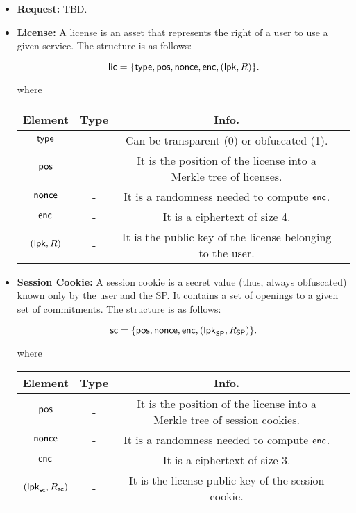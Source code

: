 \begin{itemize}
    \item \textbf{Request:} TBD.

    \item \textbf{License:} A license is an asset that represents the right of a user to use a given service. The structure is as follows:

    $$\mathsf{lic} = \{\mathsf{type}, \mathsf{pos}, \mathsf{nonce}, \mathsf{enc}, (\mathsf{lpk}, R)\}.$$

    where

    \begin{center}
        \begin{tabular}{ |c|c|c|c| } 
        \hline
        \textbf{Element} & \textbf{Type} & \textbf{Info.} \\
        \hline
        $\mathsf{type}$ & - & Can be transparent (0) or obfuscated (1). \\ 
        $\mathsf{pos}$ & - & It is the position of the license into a Merkle tree of licenses. \\ 
        $\mathsf{nonce}$ & - & It is a randomness needed to compute $\mathsf{enc}$. \\ 
        $\mathsf{enc}$ & - & It is a ciphertext of size 4. \\
        $(\mathsf{lpk}, R)$ & - & It is the public key of the license belonging to the user. \\
        \hline
        \end{tabular}
    \end{center}

    \item \textbf{Session Cookie:} A session cookie is a secret value (thus, always obfuscated) known only by the user and the SP. It contains a set of openings to a given set of commitments. The structure is as follows:

    $$\mathsf{sc} = \{\mathsf{pos}, \mathsf{nonce}, \mathsf{enc}, (\mathsf{lpk}_{\mathsf{SP}}, R_{\mathsf{SP}})\}.$$

    where

    \begin{center}
        \begin{tabular}{ |c|c|c|c| } 
        \hline
        \textbf{Element} & \textbf{Type} & \textbf{Info.} \\
        \hline
        $\mathsf{pos}$ & - & It is the position of the license into a Merkle tree of session cookies. \\ 
        $\mathsf{nonce}$ & - & It is a randomness needed to compute $\mathsf{enc}$. \\ 
        $\mathsf{enc}$ & - & It is a ciphertext of size 3. \\
        $(\mathsf{lpk}_{\mathsf{sc}}, R_{\mathsf{sc}})$ & - & It is the license public key of the session cookie. \\
        \hline
        \end{tabular}
    \end{center}

\end{itemize}